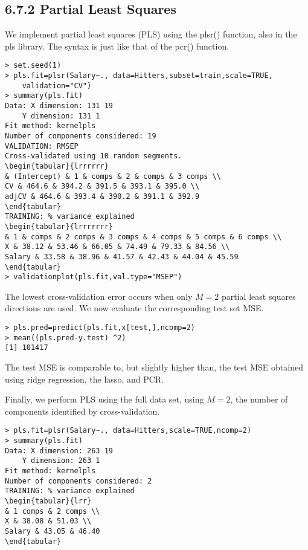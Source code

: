 \documentclass[10pt]{article}
\begin{document}
\subsection*{6.7.2 Partial Least Squares}
We implement partial least squares (PLS) using the plsr() function, also in the pls library. The syntax is just like that of the pcr() function.

\begin{verbatim}
> set.seed(1)
> pls.fit=plsr(Salary~., data=Hitters,subset=train,scale=TRUE,
    validation="CV")
> summary(pls.fit)
Data: X dimension: 131 19
    Y dimension: 131 1
Fit method: kernelpls
Number of components considered: 19
VALIDATION: RMSEP
Cross-validated using 10 random segments.
\begin{tabular}{lrrrrrr} 
& (Intercept) & 1 & comps & 2 & comps & 3 comps \\
CV & 464.6 & 394.2 & 391.5 & 393.1 & 395.0 \\
adjCV & 464.6 & 393.4 & 390.2 & 391.1 & 392.9
\end{tabular}
TRAINING: % variance explained
\begin{tabular}{lrrrrrrr} 
& 1 & comps & 2 comps & 3 comps & 4 comps & 5 comps & 6 comps \\
X & 38.12 & 53.46 & 66.05 & 74.49 & 79.33 & 84.56 \\
Salary & 33.58 & 38.96 & 41.57 & 42.43 & 44.04 & 45.59
\end{tabular}
> validationplot(pls.fit,val.type="MSEP")
\end{verbatim}

The lowest cross-validation error occurs when only $M=2$ partial least squares directions are used. We now evaluate the corresponding test set MSE.

\begin{verbatim}
> pls.pred=predict(pls.fit,x[test,],ncomp=2)
> mean((pls.pred-y.test) ^2)
[1] 101417
\end{verbatim}

The test MSE is comparable to, but slightly higher than, the test MSE obtained using ridge regression, the lasso, and PCR.

Finally, we perform PLS using the full data set, using $M=2$, the number of components identified by cross-validation.

\begin{verbatim}
> pls.fit=plsr(Salary~., data=Hitters,scale=TRUE,ncomp=2)
> summary(pls.fit)
Data: X dimension: 263 19
    Y dimension: 263 1
Fit method: kernelpls
Number of components considered: 2
TRAINING: % variance explained
\begin{tabular}{lrr} 
& 1 comps & 2 comps \\
X & 38.08 & 51.03 \\
Salary & 43.05 & 46.40
\end{tabular}
\end{verbatim}
\end{document}

